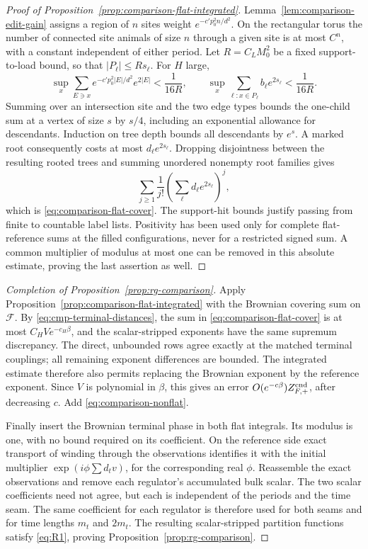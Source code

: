 \begin{proof}[Proof of Proposition~\ref{prop:comparison-flat-integrated}]
Lemma~\ref{lem:comparison-edit-gain} assigns a region of \(n\) sites
weight \(e^{-c'p_0^2n/d^2}\).  On the rectangular torus the number of
connected site animals of size \(n\) through a given site is at most
\(C^n\), with a constant independent of either period.  Let
\(R=C_LM_0^2\) be a fixed support-to-load bound, so that
\(|P_\ell|\le Rs_\ell\).  For \(H\) large,
\[
 \sup_x\sum_{E\ni x}e^{-c'p_0^2|E|/d^2}e^{2|E|}
 <\frac1{16R},\qquad
 \sup_x\sum_{\ell:x\in P_\ell}b_\ell e^{2s_\ell}
 <\frac1{16R}.
\]
Summing over an intersection site and the two edge types bounds the
one-child sum at a vertex of size \(s\) by \(s/4\), including an
exponential allowance for descendants.  Induction on tree depth bounds
all descendants by \(e^s\).  A marked root consequently costs at most
\(d_\ell e^{2s_\ell}\).  Dropping disjointness between the resulting rooted
trees and summing unordered nonempty root families gives
\[
 \sum_{j\ge1}\frac1{j!}
       \left(\sum_\ell d_\ell e^{2s_\ell}\right)^j,
\]
which is \eqref{eq:comparison-flat-cover}.  The support-hit bounds justify
passing from finite to countable label lists.  Positivity has been used
only for complete flat-reference sums at the filled configurations,
never for a restricted signed sum.  A common multiplier of modulus at
most one can be removed in this absolute estimate, proving the last
assertion as well.
\end{proof}

\begin{proof}[Completion of Proposition~\ref{prop:rg-comparison}]
Apply Proposition~\ref{prop:comparison-flat-integrated} with the Brownian
covering sum on \(\mathcal F\).  By \eqref{eq:cmp-terminal-distances}, the sum in \eqref{eq:comparison-flat-cover} is at most
\(C_HV e^{-c_H\beta}\), and the scalar-stripped exponents have the same
supremum discrepancy.  The direct, unbounded rows agree exactly at the
matched terminal couplings; all remaining exponent differences are
bounded.  The integrated estimate therefore also permits replacing the
Brownian exponent by the reference exponent.  Since \(V\) is polynomial
in \(\beta\), this gives an error \(O(e^{-c\beta})Z_{F,+}^{\rm end}\),
after decreasing \(c\).  Add \eqref{eq:comparison-nonflat}.

Finally insert the Brownian terminal phase in both flat integrals.  Its
modulus is one, with no bound required on its coefficient.  On the
reference side exact transport of winding through the observations
identifies it with the initial multiplier
\(\exp(i\phi\sum d_tv)\), for the corresponding real \(\phi\).
Reassemble the exact observations and remove each regulator's accumulated
bulk scalar.  The two scalar coefficients need not agree, but each is
independent of the periods and the time seam.  The same coefficient for
each regulator is therefore used for both seams and for time lengths
\(m_t\) and \(2m_t\).  The resulting scalar-stripped partition functions
satisfy \eqref{eq:R1}, proving Proposition~\ref{prop:rg-comparison}.
\end{proof}
